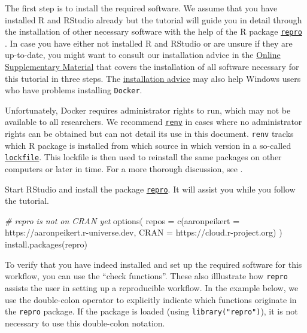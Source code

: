 \documentclass[psych,tutorial,submit,moreauthors,pdftex]{mdpi}
\newenvironment{Shaded}{\begin{snugshade}}{\end{snugshade}}
\newcommand{\AttributeTok}[1]{\textcolor[rgb]{0.77,0.63,0.00}{#1}}
\newcommand{\CommentTok}[1]{\textcolor[rgb]{0.56,0.35,0.01}{\textit{#1}}}
\newcommand{\FunctionTok}[1]{\textcolor[rgb]{0.00,0.00,0.00}{#1}}
\newcommand{\NormalTok}[1]{#1}
\newcommand{\StringTok}[1]{\textcolor[rgb]{0.31,0.60,0.02}{#1}}
\begin{document}
The first step is to install the required software. We assume that you
have installed R \citep[version 4.0.4]{R-base} and RStudio
\citep[version 1.4]{rstudio} already but the tutorial will guide you in
detail through the installation of other necessary software with the
help of the R package
\href{https://github.com/aaronpeikert/repro}{\texttt{repro}}
\citep{R-repro}. In case you have either not installed R and RStudio or
are unsure if they are up-to-date, you might want to consult our
installation advice in the
\href{https://github.com/aaronpeikert/repro-tutorial/blob/main/install.md}{Online
Supplementary Material} that covers the installation of all software
necessary for this tutorial in three steps. The
\href{(https://github.com/aaronpeikert/repro-tutorial/blob/main/install.md)}{installation
advice} may also help Windows users who have problems installing
\texttt{Docker}.

Unfortunately, Docker requires administrator rights to run, which may
not be available to all researchers. We recommend
\href{https://rstudio.github.io/renv/articles/renv.html}{\texttt{renv}}
\citep{R-renv} in cases where no administrator rights can be obtained
but can not detail its use in this document. \texttt{renv} tracks which
R package is installed from which source in which version in a so-called
\href{https://rstudio.github.io/renv/articles/lockfile.html}{\texttt{lockfile}}.
This lockfile is then used to reinstall the same packages on other
computers or later in time. For a more thorough discussion, see
\citet{vanlissa2020worcs}.

Start RStudio and install the package
\href{https://github.com/aaronpeikert}{\texttt{repro}}\citep{R-repro}.
It will assist you while you follow the tutorial.

\begin{Shaded}
\begin{Highlighting}[]
\CommentTok{\# repro is not on CRAN yet}
\FunctionTok{options}\NormalTok{(}
  \AttributeTok{repos =} \FunctionTok{c}\NormalTok{(}\AttributeTok{aaronpeikert =} \StringTok{\textquotesingle{}https://aaronpeikert.r{-}universe.dev\textquotesingle{}}\NormalTok{,}
            \AttributeTok{CRAN =} \StringTok{\textquotesingle{}https://cloud.r{-}project.org\textquotesingle{}}\NormalTok{)}
\NormalTok{)}
\FunctionTok{install.packages}\NormalTok{(}\StringTok{\textquotesingle{}repro\textquotesingle{}}\NormalTok{)}
\end{Highlighting}
\end{Shaded}

To verify that you have indeed installed and set up the required
software for this workflow, you can use the ``check functions''. These
also illlustrate how \texttt{repro} assists the user in setting up a
reproducible workflow. In the example below, we use the double-colon
operator to explicitly indicate which functions originate in the
\texttt{repro} package. If the package is loaded (using
\texttt{library("repro")}), it is not necessary to use this double-colon
notation.
\end{document}
